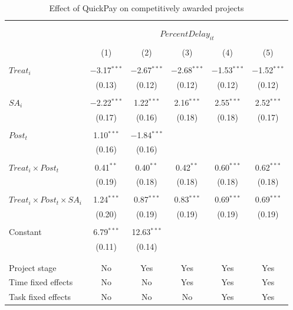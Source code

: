 \documentclass[
]{article}
\begin{document}
\begin{table}[H] \centering 
  \caption{Effect of QuickPay on competitively awarded projects} 
  \label{} 
\small 
\begin{tabular}{@{\extracolsep{-2pt}}lccccc} 
\\[-1.8ex]\hline 
\hline \\[-1.8ex] 
\\[-1.8ex] & \multicolumn{5}{c}{$PercentDelay_{it}$  } \\ 
\\[-1.8ex] & (1) & (2) & (3) & (4) & (5)\\ 
\hline \\[-1.8ex] 
 $Treat_i$ & $-$3.17$^{***}$ & $-$2.67$^{***}$ & $-$2.68$^{***}$ & $-$1.53$^{***}$ & $-$1.52$^{***}$ \\ 
  & (0.13) & (0.12) & (0.12) & (0.12) & (0.12) \\ 
  & & & & & \\ 
 $SA_i$ & $-$2.22$^{***}$ & 1.22$^{***}$ & 2.16$^{***}$ & 2.55$^{***}$ & 2.52$^{***}$ \\ 
  & (0.17) & (0.16) & (0.18) & (0.18) & (0.17) \\ 
  & & & & & \\ 
 $Post_t$ & 1.10$^{***}$ & $-$1.84$^{***}$ &  &  &  \\ 
  & (0.16) & (0.16) &  &  &  \\ 
  & & & & & \\ 
 $Treat_i \times Post_t$ & 0.41$^{**}$ & 0.40$^{**}$ & 0.42$^{**}$ & 0.60$^{***}$ & 0.62$^{***}$ \\ 
  & (0.19) & (0.18) & (0.18) & (0.18) & (0.18) \\ 
  & & & & & \\ 
 $Treat_i \times Post_t \times SA_i $ & 1.24$^{***}$ & 0.87$^{***}$ & 0.83$^{***}$ & 0.69$^{***}$ & 0.69$^{***}$ \\ 
  & (0.20) & (0.19) & (0.19) & (0.19) & (0.19) \\ 
  & & & & & \\ 
 Constant & 6.79$^{***}$ & 12.63$^{***}$ &  &  &  \\ 
  & (0.11) & (0.14) &  &  &  \\ 
  & & & & & \\ 
\hline \\[-1.8ex] 
Project stage & No & Yes & Yes & Yes & Yes \\ 
Time fixed effects & No & No & Yes & Yes & Yes \\ 
Task fixed effects & No & No & No & Yes & Yes \\ 

\end{tabular}
\end{table}
\end{document}
